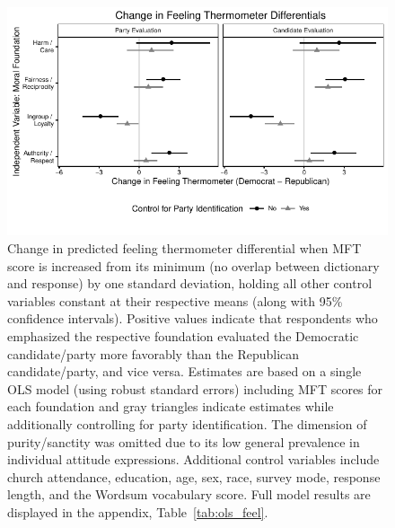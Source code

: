 \documentclass[12pt]{article}
\begin{document}
\begin{figure}[ht]\centering
\includegraphics{../calc/fig/ols_feel.pdf}
\caption{Change in predicted feeling thermometer differential when MFT score is increased from its minimum (no overlap between dictionary and response) by one standard deviation, holding all other control variables constant at their respective means (along with 95\% confidence intervals). Positive values indicate that respondents who emphasized the respective foundation evaluated the Democratic candidate/party more favorably than the Republican candidate/party, and vice versa. Estimates are based on a single OLS model (using robust standard errors) including MFT scores for each foundation and gray triangles indicate estimates while additionally controlling for party identification. The dimension of purity/sanctity was omitted due to its low general prevalence in individual attitude expressions. Additional control variables include church attendance, education, age, sex, race, survey mode, response length, and the Wordsum vocabulary score. Full model results are displayed in the appendix, Table~\ref{tab:ols_feel}.
}\label{fig:ols_feel}
\end{figure}
\end{document}
